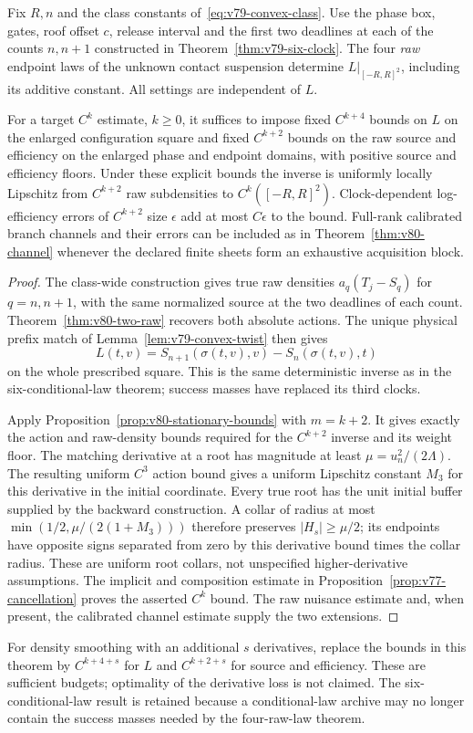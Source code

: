 \begin{theorem}
\label{thm:v80-four-convex}
Fix $R,n$ and the class constants of~\eqref{eq:v79-convex-class}.
Use the phase box, gates, roof offset $c$, release interval and the
first two deadlines at each of the counts $n,n+1$ constructed in
Theorem~\ref{thm:v79-six-clock}.  The four \emph{raw} endpoint laws
of the unknown contact suspension determine $L|_{[-R,R]^2}$, including
its additive constant.  All settings are independent of $L$.

For a target $C^k$ estimate, $k\ge0$, it suffices to impose fixed
$C^{k+4}$ bounds on $L$ on the enlarged configuration square and
fixed $C^{k+2}$ bounds on the raw source and efficiency on the enlarged
phase and endpoint domains, with positive source and efficiency floors.
Under these explicit bounds the inverse is uniformly locally Lipschitz
from $C^{k+2}$ raw subdensities to $C^k([-R,R]^2)$.
Clock-dependent log-efficiency errors of $C^{k+2}$ size $\epsilon$
add at most $C\epsilon$ to the bound.  Full-rank calibrated branch
channels and their errors can be included as in
Theorem~\ref{thm:v80-channel} whenever the declared finite sheets form
an exhaustive acquisition block.
\end{theorem}
\begin{proof}
The class-wide construction gives true raw densities
$a_q(T_j-S_q)$ for $q=n,n+1$, with the same normalized source at
the two deadlines of each count.  Theorem~\ref{thm:v80-two-raw}
recovers both absolute actions.  The unique physical prefix match of
Lemma~\ref{lem:v79-convex-twist} then gives
\[
       L(t,v)=S_{n+1}(\sigma(t,v),v)-S_n(\sigma(t,v),t)
\]
on the whole prescribed square.  This is the same deterministic inverse
as in the six-conditional-law theorem; success masses have replaced
its third clocks.

Apply Proposition~\ref{prop:v80-stationary-bounds} with $m=k+2$.
It gives exactly the action and raw-density bounds required for the
$C^{k+2}$ inverse and its weight floor.  The matching derivative at a
root has magnitude at least $\mu=u_n^2/(2\Lambda)$.  The resulting
uniform $C^3$ action bound gives a uniform Lipschitz constant $M_3$ for
this derivative in the initial coordinate.  Every true root has the
unit initial buffer supplied by the backward construction.  A collar
of radius at most $\min(1/2,\mu/(2(1+M_3)))$ therefore preserves
$|H_s|\ge\mu/2$; its endpoints have opposite signs separated from
zero by this derivative bound times the collar radius.  These are
uniform root collars, not unspecified higher-derivative assumptions.
The implicit and composition estimate in
Proposition~\ref{prop:v77-cancellation} proves the asserted $C^k$
bound.  The raw nuisance estimate and, when present, the calibrated
channel estimate supply the two extensions.
\end{proof}

For density smoothing with an additional $s$ derivatives, replace the
bounds in this theorem by $C^{k+4+s}$ for $L$ and $C^{k+2+s}$ for
source and efficiency.  These are sufficient budgets; optimality of
the derivative loss is not claimed.  The six-conditional-law result is
retained because a conditional-law archive may no longer contain the
success masses needed by the four-raw-law theorem.

